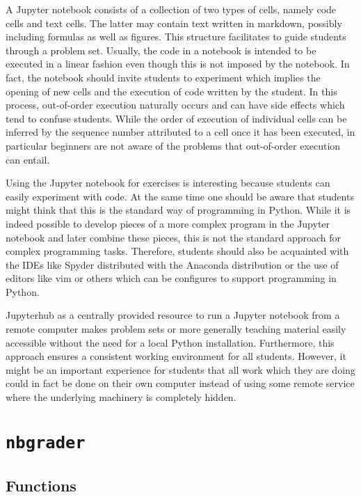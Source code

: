 \documentclass[twocolumn]{svjour3}          %
\begin{document}
A Jupyter notebook consists of a collection of two types of cells, namely code
cells and text cells. The latter may contain text written in markdown, possibly
including formulas as well as figures. This structure facilitates to guide
students through a problem set. Usually, the code in a notebook is intended to
be executed in a linear fashion even though this is not imposed by the
notebook. In fact, the notebook should invite students to experiment which
implies the opening of new cells and the execution of code written by the
student. In this process, out-of-order execution naturally occurs and can have
side effects which tend to confuse students. While the order of execution of
individual cells can be inferred by the sequence number attributed to a cell
once it has been executed, in particular beginners are not aware of the
problems that out-of-order execution can entail.

Using the Jupyter notebook for exercises is interesting because students can
easily experiment with code. At the same time one should be aware that students
might think that this is the standard way of programming in Python. While it is
indeed possible to develop pieces of a more complex program in the Jupyter 
notebook and later combine these pieces, this is not the standard approach for
complex programming tasks. Therefore, students should also be acquainted with
the IDEs like Spyder distributed with the Anaconda distribution or the use of
editors like vim or others which can be configures to support programming in
Python.

Jupyterhub as a centrally provided resource to run a Jupyter notebook from a
remote computer makes problem sets or more generally teaching material easily
accessible without the need for a local Python installation. Furthermore, this
approach ensures a consistent working environment for all students. However,
it might be an important experience for students that all work which they
are doing could in fact be done on their own computer instead of using some
remote service where the underlying machinery is completely hidden.

\section{\texttt{nbgrader}}

\subsection{Functions}
\end{document}
